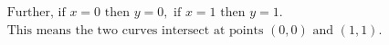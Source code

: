 \documentclass[preview]{standalone}
\begin{document}
\begin{align*}
\text{Further, if } x=0 \text{ then } y=0, \text{ if } x=1 \text{ then } y=1. \\ \text{This means the two curves intersect at points } (0,0) \text{ and } (1,1).
\end{align*}
\end{document}
